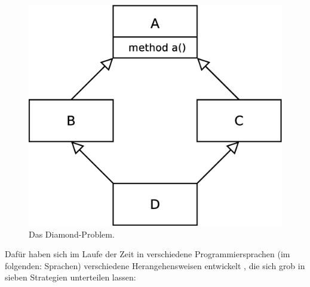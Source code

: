 \begin{figure}[h]
\centering
 \includegraphics[scale = 0.3]{pictures/diamond}
 \caption{Das Diamond-Problem.}
 \label{diamond}
\end{figure}

Dafür haben sich im Laufe der Zeit in verschiedene Programmiersprachen (im folgenden: Sprachen) verschiedene Herangehensweisen entwickelt \cite{wikipedia}, die sich grob in sieben Strategien unterteilen lassen:

